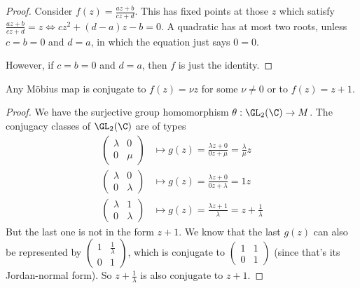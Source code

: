 \documentclass[a4paper]{article}
\begin{document}
  \begin{proof}
    Consider $f(z) = \frac{az + b}{cz + d}$. This has fixed points at those $z$ which satisfy $\frac{az + b}{cz + d} = z \Leftrightarrow cz^2 + (d - a)z - b = 0$. A quadratic has at most two roots, unless $c = b = 0$ and $d = a$, in which the equation just says $0 = 0$.

    However, if $c = b= 0$ and $d = a$, then $f$ is just the identity. 
  \end{proof}

  \begin{prop}
    Any M\"obius map is conjugate to $f(z) = \nu z$ for some $\nu\not= 0$ or to $f(z) = z + 1$.
  \end{prop}

  \begin{proof}
    We have the surjective group homomorphism $\theta: \GL_2(\C) \to M$. The conjugacy classes of $\GL_2(\C)$ are of types
    \begin{align*}
      \begin{pmatrix}
        \lambda & 0\\
        0 & \mu
      \end{pmatrix} &\mapsto g(z) = \frac{\lambda z + 0}{0z + \mu} = \frac{\lambda}{\mu}z\\
      \begin{pmatrix}
        \lambda & 0\\
        0 & \lambda
      \end{pmatrix} &\mapsto g(z) = \frac{\lambda z + 0}{0z + \lambda} = 1 z\\
      \begin{pmatrix}
        \lambda & 1\\
        0 & \lambda
      \end{pmatrix} &\mapsto g(z) = \frac{\lambda z + 1}{\lambda} = z + \frac{1}{\lambda}
    \end{align*}
    But the last one is not in the form $z + 1$. We know that the last $g(z)$ can also be represented by $
    \begin{pmatrix}
      1 & \frac{1}{\lambda}\\
      0 & 1
    \end{pmatrix}$, which is conjugate to $
    \begin{pmatrix}
      1 & 1\\
      0 & 1
    \end{pmatrix}$ (since that's its Jordan-normal form). So $z + \frac{1}{\lambda}$ is also conjugate to $z + 1$.
  \end{proof}
\end{document}
